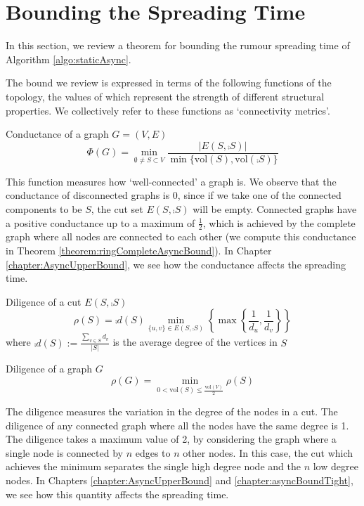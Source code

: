 \section{Bounding the Spreading Time}\label{section:graphMetrics}

In this section, we review a theorem for bounding the rumour spreading time of Algorithm \ref{algo:staticAsync}.

The bound we review is expressed in terms of the following functions of the topology, the values of which represent the strength of different structural properties. We collectively refer to these functions as `connectivity metrics'.

\begin{definition}
	Conductance of a graph $G = (V, E)$
	$$
		\Phi(G) = \min_{\emptyset \neq S \subset V} \frac{|E(S, \comp{S})|}{\min\{\text{vol}(S), \text{vol}(\comp{S})\}}
	$$
\end{definition}

This function measures how `well-connected' a graph is. We observe that the conductance of disconnected graphs is 0, since if we take one of the connected components to be $S$, the cut set $E(S, \comp{S})$ will be empty. Connected graphs have a positive conductance up to a maximum of $\frac{1}{2}$, which is achieved by the complete graph where all nodes are connected to each other (we compute this conductance in Theorem \ref{theorem:ringCompleteAsyncBound}). In Chapter \ref{chapter:AsyncUpperBound}, we see how the conductance affects the spreading time. 

\begin{definition}
	Diligence of a cut $ E(S, \comp{S}) $
	$$
		\rho(S) = \comp{d}(S) \min_{\{u, v\} \in E(S, \comp{S}) } \left\{ \max \left\{ \frac{1}{d_u},\frac{1}{d_v} \right\} \right\}
	$$ 
	where $\comp{d}(S) := \frac{\sum_{v \in S} d_v}{|S|}$ is the average degree of the vertices in $S$
\end{definition}

\begin{definition}
	Diligence of a graph $G$
	$$
		\rho(G) = \min_{0 < \text{vol}(S) \leq \frac{\text{vol}(V)}{2}} \rho(S) 
	$$
\end{definition}

The diligence measures the variation in the degree of the nodes in a cut. The diligence of any connected graph where all the nodes have the same degree is 1. The diligence takes a maximum value of 2, by considering the graph where a single node is connected by $n$ edges to $n$ other nodes. In this case, the cut which achieves the minimum separates the single high degree node and the $n$ low degree nodes. In Chapters \ref{chapter:AsyncUpperBound} and \ref{chapter:asyncBoundTight}, we see how this quantity affects the spreading time. 

